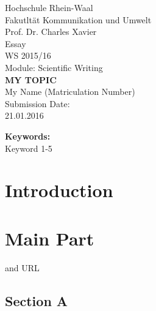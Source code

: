 \frontmatter %

\begin{titlepage}
	\begin{center}
	Hochschule Rhein-Waal\\
	Fakutltät Kommunikation und Umwelt\\
	Prof. Dr. Charles Xavier\\
	\vspace{2cm}
	Essay\\
	WS 2015/16\\
	Module: Scientific Writing\\
	\vspace{3cm}
	\uppercase{\textbf{\Large{My Topic}}}\\
	\vspace{8cm}
	My Name (Matriculation Number)\\
	\vspace{1cm}
	Submission Date:\\
	21.01.2016
	\end{center}
\end{titlepage}
\newpage

\lipsum[5]
\textbf{Keywords:}\\
Keyword 1-5
\newpage

\tableofcontents
\newpage

\begin{acronym}[rpnx]
\end{acronym}

\lstlistoflistings
\clearpage
\listoftables 
\clearpage
\listoffigures
\clearpage

\mainmatter %
\acresetall %

\chapter{Introduction}
\label{sec:introduction}
\lipsum[1]

\chapter{Main Part}
\label{sec:main}
\lipsum[2] and \ac{URL}

\section{Section A}
\label{sec:a}
\lipsum[3] \autocite{doe2005}

